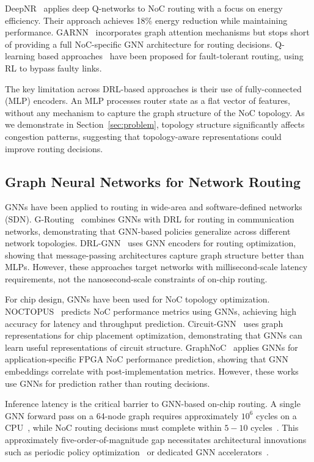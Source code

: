 DeepNR~\cite{deepnr2022} applies deep Q-networks to NoC routing with a focus on energy efficiency. Their approach achieves 18\% energy reduction while maintaining performance. GARNN~\cite{garnn2023} incorporates graph attention mechanisms but stops short of providing a full NoC-specific GNN architecture for routing decisions. Q-learning based approaches~\cite{choudhary2026} have been proposed for fault-tolerant routing, using RL to bypass faulty links.

The key limitation across DRL-based approaches is their use of fully-connected (MLP) encoders. An MLP processes router state as a flat vector of features, without any mechanism to capture the graph structure of the NoC topology. As we demonstrate in Section~\ref{sec:problem}, topology structure significantly affects congestion patterns, suggesting that topology-aware representations could improve routing decisions.

\subsection{Graph Neural Networks for Network Routing}

GNNs have been applied to routing in wide-area and software-defined networks (SDN). G-Routing~\cite{g-routing2023} combines GNNs with DRL for routing in communication networks, demonstrating that GNN-based policies generalize across different network topologies. DRL-GNN~\cite{drl-gnn2019} uses GNN encoders for routing optimization, showing that message-passing architectures capture graph structure better than MLPs. However, these approaches target networks with millisecond-scale latency requirements, not the nanosecond-scale constraints of on-chip routing.

For chip design, GNNs have been used for NoC topology optimization. NOCTOPUS~\cite{noctopus2026} predicts NoC performance metrics using GNNs, achieving high accuracy for latency and throughput prediction. Circuit-GNN~\cite{mirhoseini2021} uses graph representations for chip placement optimization, demonstrating that GNNs can learn useful representations of circuit structure. GraphNoC~\cite{graphnoc2024} applies GNNs for application-specific FPGA NoC performance prediction, showing that GNN embeddings correlate with post-implementation metrics. However, these works use GNNs for prediction rather than routing decisions.

Inference latency is the critical barrier to GNN-based on-chip routing. A single GNN forward pass on a 64-node graph requires approximately $10^6$ cycles on a CPU~\cite{xiao2024}, while NoC routing decisions must complete within $5-10$ cycles~\cite{wang2022maar}. This approximately five-order-of-magnitude gap necessitates architectural innovations such as periodic policy optimization~\cite{periodic2025} or dedicated GNN accelerators~\cite{xiao2024}.

